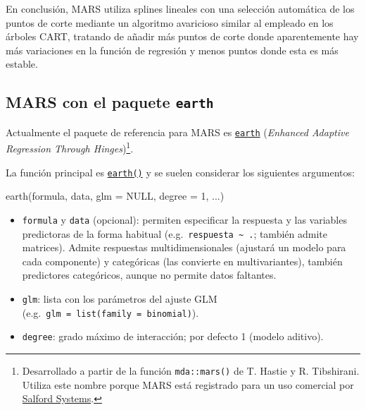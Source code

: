 \documentclass[
]{book}
\newenvironment{Shaded}{\begin{snugshade}}{\end{snugshade}}
\newcommand{\AttributeTok}[1]{\textcolor[rgb]{0.77,0.63,0.00}{#1}}
\newcommand{\ConstantTok}[1]{\textcolor[rgb]{0.00,0.00,0.00}{#1}}
\newcommand{\DecValTok}[1]{\textcolor[rgb]{0.00,0.00,0.81}{#1}}
\newcommand{\FunctionTok}[1]{\textcolor[rgb]{0.00,0.00,0.00}{#1}}
\newcommand{\NormalTok}[1]{#1}
\theoremstyle{break}
\theoremstyle{nonumberplain}
\begin{document}
En conclusión, MARS utiliza splines lineales con una selección automática de los puntos de corte mediante un algoritmo avaricioso similar al empleado en los árboles CART, tratando de añadir más puntos de corte donde aparentemente hay más variaciones en la función de regresión y menos puntos donde esta es más estable.

\hypertarget{mars-con-el-paquete-earth}{%
\subsection{\texorpdfstring{MARS con el paquete \texttt{earth}}{MARS con el paquete earth}}\label{mars-con-el-paquete-earth}}

Actualmente el paquete de referencia para MARS es \href{http://www.milbo.users.sonic.net/earth}{\texttt{earth}} (\emph{Enhanced Adaptive Regression Through Hinges})\footnote{Desarrollado a partir de la función \texttt{mda::mars()} de T. Hastie y R. Tibshirani. Utiliza este nombre porque MARS está registrado para un uso comercial por \href{https://www.salford-systems.com}{Salford Systems}.}.

La función principal es \href{https://rdrr.io/pkg/earth/man/earth.html}{\texttt{earth()}} y se suelen considerar los siguientes argumentos:

\begin{Shaded}
\begin{Highlighting}[]
\FunctionTok{earth}\NormalTok{(formula, data, }\AttributeTok{glm =} \ConstantTok{NULL}\NormalTok{, }\AttributeTok{degree =} \DecValTok{1}\NormalTok{, ...) }
\end{Highlighting}
\end{Shaded}

\begin{itemize}
\item
  \texttt{formula} y \texttt{data} (opcional): permiten especificar la respuesta y las variables predictoras de la forma habitual (e.g.~\texttt{respuesta\ \textasciitilde{}\ .}; también admite matrices). Admite respuestas multidimensionales (ajustará un modelo para cada componente) y categóricas (las convierte en multivariantes), también predictores categóricos, aunque no permite datos faltantes.
\item
  \texttt{glm}: lista con los parámetros del ajuste GLM (e.g.~\texttt{glm\ =\ list(family\ =\ binomial)}).
\item
  \texttt{degree}: grado máximo de interacción; por defecto 1 (modelo aditivo).
\end{itemize}
\end{document}
